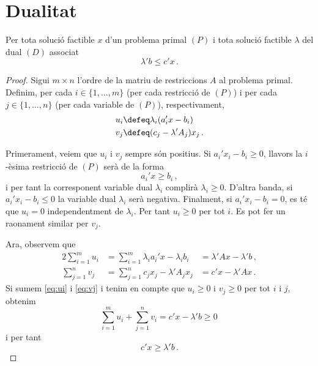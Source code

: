 \chapter{Dualitat}

\begin{teo}\label{teo:dualitat-feble}
    Per tota solució factible $x$ d'un problema primal $\left(P\right)$ i tota solució factible $\lambda$ del dual $\left(D\right)$ associat
    \[ \lambda'b\leq c'x\,. \]
    \begin{proof}
    	Sigui $m\times n$ l'ordre de la matriu de restriccions $A$ al problema primal. Definim, per cada $i\in\{1,\ldots,m\}$ (per cada restricció de $(P)$) i per cada $j\in\{1,\ldots,n\}$ (per cada variable de $(P)$), respectivament, 
    	\begin{align*}
    		u_i &\defeq \lambda_i(a_i'x-b_i)\\
    		v_j &\defeq (c_j - \lambda'A_j)x_j\,.
    	\end{align*}
    	
    	Primerament, veiem que $u_i$ i $v_j$ sempre són positius. Si $a_i'x_i-b_i \ge 0$, llavors la $i$-èsima restricció de $(P)$ serà de la forma \[a_i'x \ge b_i\,,\] i per tant la corresponent variable dual $\lambda_i$ complirà $\lambda_i \ge 0$. D'altra banda, si $a_i'x_i-b_i \le 0$ la variable dual $\lambda_i$ serà negativa. Finalment, si $a_i'x_i-b_i = 0$, es té que $u_i = 0$ independentment de $\lambda_i$. Per tant $u_i \ge 0$ per tot $i$. Es pot fer un raonament similar per $v_j$.
    	
    	Ara, observem que
    	\begin{alignat}{2}{}
    		\sum_{i = 1}^{m} u_i &= \sum_{i = 1}^{m} \lambda_ia_i'x-\lambda_ib_i &= \lambda'Ax - \lambda'b\,, \label{eq:ui}\\
    		\sum_{j = 1}^{n} v_j &= \sum_{j = 1}^{n} c_jx_j - \lambda'A_jx_j &= c'x - \lambda'Ax\,. \label{eq:vj}
    	\end{alignat}
    	Si sumem \eqref{eq:ui} i \eqref{eq:vj} i tenim en compte que $u_i \ge 0$ i $v_j \ge 0$ per tot $i$ i $j$, obtenim
    	\begin{equation*}
    		\sum_{i = 1}^{m} u_i + \sum_{j = 1}^{n} v_i= c'x-\lambda'b \ge 0\,
    	\end{equation*}
    	i per tant \[c'x \ge \lambda'b\,.\]
    \end{proof}
\end{teo}
